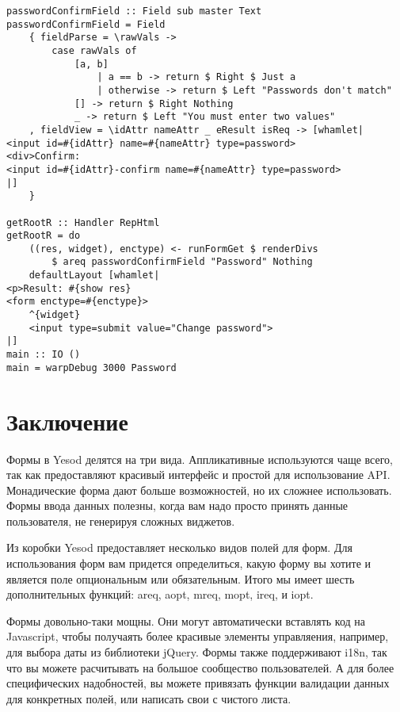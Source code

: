 \begin{lstlisting}
passwordConfirmField :: Field sub master Text
passwordConfirmField = Field
    { fieldParse = \rawVals ->
        case rawVals of
            [a, b]
                | a == b -> return $ Right $ Just a
                | otherwise -> return $ Left "Passwords don't match"
            [] -> return $ Right Nothing
            _ -> return $ Left "You must enter two values"
    , fieldView = \idAttr nameAttr _ eResult isReq -> [whamlet|
<input id=#{idAttr} name=#{nameAttr} type=password>
<div>Confirm:
<input id=#{idAttr}-confirm name=#{nameAttr} type=password>
|]
    }

getRootR :: Handler RepHtml
getRootR = do
    ((res, widget), enctype) <- runFormGet $ renderDivs
        $ areq passwordConfirmField "Password" Nothing
    defaultLayout [whamlet|
<p>Result: #{show res}
<form enctype=#{enctype}>
    ^{widget}
    <input type=submit value="Change password">
|]
main :: IO ()
main = warpDebug 3000 Password
\end{lstlisting}

\section{Заключение}

Формы в Yesod делятся на три вида. Аппликативные используются чаще всего, так как
предоставляют красивый интерфейс и простой для использование API. Монадические форма дают
больше возможностей, но их сложнее использовать. Формы ввода данных полезны, когда вам
надо просто принять данные пользователя, не генерируя сложных виджетов.

Из коробки Yesod предоставляет несколько видов полей для форм. Для использования
форм вам придется определиться, какую форму вы хотите и является поле опциональным или
обязательным. Итого мы имеет шесть дополнительных функций: areq, aopt, mreq, mopt, ireq,
и iopt.

Формы довольно-таки мощны. Они могут автоматически вставлять код на Javascript, чтобы
получаять более красивые элементы управляения, например, для выбора даты из библиотеки 
jQuery. Формы также поддерживают  i18n, так что вы можете расчитывать на большое
сообщество пользователей. А для более специфических надобностей, вы можете привязать
функции валидации данных для конкретных полей, или написать свои с чистого  листа.

